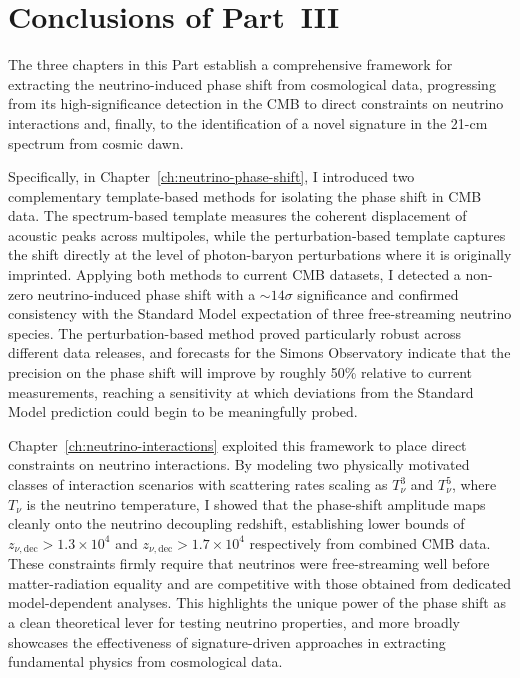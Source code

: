 \chapter*{Conclusions of Part~III}
\label{ch:part3-concl}

The three chapters in this Part establish a comprehensive framework for extracting the neutrino-induced phase shift from cosmological data, progressing from its high-significance detection in the CMB to direct constraints on neutrino interactions and, finally, to the identification of a novel signature in the 21-cm spectrum from cosmic dawn.

Specifically, in Chapter~\ref{ch:neutrino-phase-shift}, I introduced two complementary template-based methods for isolating the phase shift in CMB data. The spectrum-based template measures the coherent displacement of acoustic peaks across multipoles, while the perturbation-based template captures the shift directly at the level of photon-baryon perturbations where it is originally imprinted. Applying both methods to current CMB datasets, I detected a non-zero neutrino-induced phase shift with a $\sim 14\sigma$ significance and confirmed consistency with the Standard Model expectation of three free-streaming neutrino species. The perturbation-based method proved particularly robust across different data releases, and forecasts for the Simons Observatory indicate that the precision on the phase shift will improve by roughly 50\%  relative to current measurements, reaching a sensitivity at which deviations from the Standard Model prediction could begin to be meaningfully probed.

Chapter~\ref{ch:neutrino-interactions} exploited this framework to place direct constraints on neutrino interactions. By modeling two physically motivated classes of interaction scenarios with scattering rates scaling as $T_\nu^3$ and $T_\nu^5$, where $T_\nu$ is the neutrino temperature, I showed that the phase-shift amplitude maps cleanly onto the neutrino decoupling redshift, establishing lower bounds of $z_{\nu,\mathrm{dec}} > 1.3 \times 10^4$ and $z_{\nu,\mathrm{dec}} > 1.7 \times 10^4$ respectively from combined CMB data. These constraints firmly require that neutrinos were free-streaming well before matter-radiation equality and are competitive with those obtained from dedicated model-dependent analyses. This highlights the unique power of the phase shift as a clean theoretical lever for testing neutrino properties, and more broadly showcases the effectiveness of signature-driven approaches in extracting fundamental physics from cosmological data.

